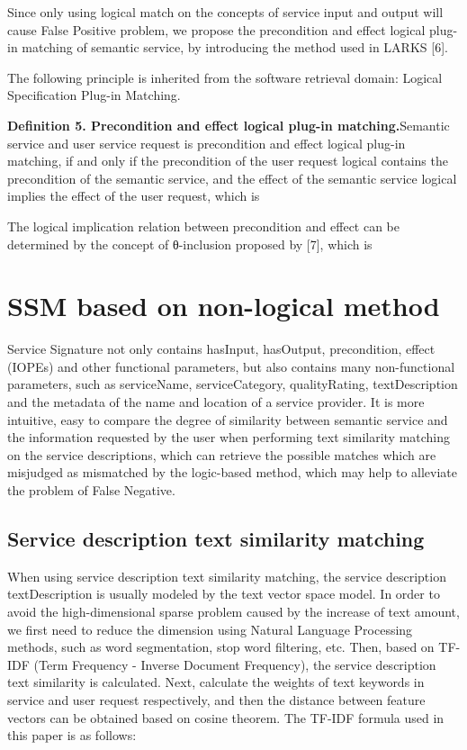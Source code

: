 \documentclass{ieeeaccess}
\begin{document}
Since only using logical match on the concepts of service input and output will cause False Positive problem, we propose the precondition and effect logical plug-in matching of semantic service, by introducing the method used in LARKS [6].

The following principle is inherited from the software retrieval domain: Logical Specification Plug-in Matching.

\textbf{Definition 5. Precondition and effect logical plug-in matching.}Semantic service and user service request is precondition and effect logical plug-in matching, if and only if the precondition of the user request logical contains the precondition of the semantic service, and the effect of the semantic service logical implies the effect of the user request, which is
 
The logical implication relation between precondition and effect can be determined by the concept of θ-inclusion proposed by [7], which is

\section{SSM based on non-logical method}
Service Signature not only contains hasInput, hasOutput, precondition, effect (IOPEs) and other functional parameters, but also contains many non-functional parameters, such as serviceName, serviceCategory, qualityRating, textDescription and the metadata of the name and location of a service provider. It is more intuitive, easy to compare the degree of similarity between semantic service and the information requested by the user when performing text similarity matching on the service descriptions, which can retrieve the possible matches which are misjudged as mismatched by the logic-based method, which may help to alleviate the problem of False Negative.

\subsection{Service description text similarity matching}
When using service description text similarity matching, the service description textDescription is usually modeled by the text vector space model. In order to avoid the high-dimensional sparse problem caused by the increase of text amount, we first need to reduce the dimension using Natural Language Processing methods, such as word segmentation, stop word filtering, etc. Then, based on TF-IDF (Term Frequency - Inverse Document Frequency), the service description text similarity is calculated. Next, calculate the weights of text keywords in service and user request respectively, and then the distance between feature vectors can be obtained based on cosine theorem. The TF-IDF formula used in this paper is as follows:
 
\end{document}
